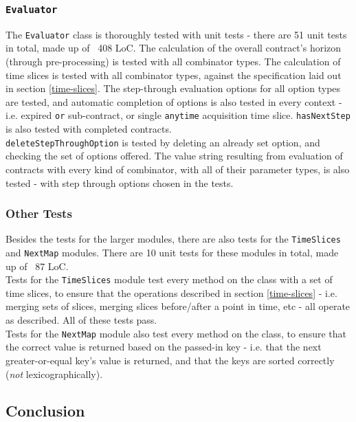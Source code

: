\subsubsection{\texttt{Evaluator}}

The \texttt{Evaluator} class is thoroughly tested with unit tests - there are 51 unit tests in total, made up of ~408 LoC. The calculation of the overall contract's horizon (through pre-processing) is tested with all combinator types. The calculation of time slices is tested with all combinator types, against the specification laid out in section \ref{time-slices}. The step-through evaluation options for all option types are tested, and automatic completion of options is also tested in every context - i.e. expired \texttt{or} sub-contract, or single \texttt{anytime} acquisition time slice. \texttt{hasNextStep} is also tested with completed contracts. \\

\texttt{deleteStepThroughOption} is tested by deleting an already set option, and checking the set of options offered. The value string resulting from evaluation of contracts with every kind of combinator, with all of their parameter types, is also tested - with step through options chosen in the tests.


\subsubsection{Other Tests}

Besides the tests for the larger modules, there are also tests for the \texttt{TimeSlices} and \texttt{NextMap} modules. There are 10 unit tests for these modules in total, made up of ~87 LoC. \\

Tests for the \texttt{TimeSlices} module test every method on the class with a set of time slices, to ensure that the operations described in section \ref{time-slices} - i.e. merging sets of slices, merging slices before/after a point in time, etc - all operate as described. All of these tests pass. \\

Tests for the \texttt{NextMap} module also test every method on the class, to ensure that the correct value is returned based on the passed-in key - i.e. that the next greater-or-equal key's value is returned, and that the keys are sorted correctly (\textit{not} lexicographically).


\subsection{Conclusion}

